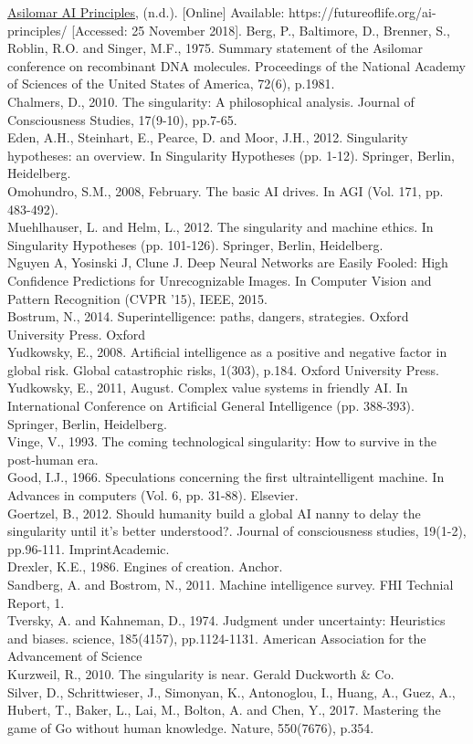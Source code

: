 \documentclass[11pt]{article}
\begin{document}
\noindent
\underline{Asilomar AI Principles}, (n.d.). [Online] Available: https://futureoflife.org/ai-principles/ [Accessed: 25 November 2018]. 
Berg, P., Baltimore, D., Brenner, S., Roblin, R.O. and Singer, M.F., 1975. Summary statement of the Asilomar conference on recombinant DNA molecules. Proceedings of the National Academy of Sciences of the United States of America, 72(6), p.1981.\\
Chalmers, D., 2010. The singularity: A philosophical analysis. Journal of Consciousness Studies, 17(9-10), pp.7-65.\\
Eden, A.H., Steinhart, E., Pearce, D. and Moor, J.H., 2012. Singularity hypotheses: an overview. In Singularity Hypotheses (pp. 1-12). Springer, Berlin, Heidelberg.\\
Omohundro, S.M., 2008, February. The basic AI drives. In AGI (Vol. 171, pp. 483-492).\\
Muehlhauser, L. and Helm, L., 2012. The singularity and machine ethics. In Singularity Hypotheses (pp. 101-126). Springer, Berlin, Heidelberg.\\
Nguyen A, Yosinski J, Clune J. Deep Neural Networks are Easily Fooled: High Confidence Predictions for Unrecognizable Images. In Computer Vision and Pattern Recognition (CVPR ’15), IEEE, 2015.\\
Bostrum, N., 2014. Superintelligence: paths, dangers, strategies. Oxford University Press. Oxford\\
Yudkowsky, E., 2008. Artificial intelligence as a positive and negative factor in global risk. Global catastrophic risks, 1(303), p.184. Oxford University Press.\\
Yudkowsky, E., 2011, August. Complex value systems in friendly AI. In International Conference on Artificial General Intelligence (pp. 388-393). Springer, Berlin, Heidelberg. \\
Vinge, V., 1993. The coming technological singularity: How to survive in the post-human era.\\
Good, I.J., 1966. Speculations concerning the first ultraintelligent machine. In Advances in computers (Vol. 6, pp. 31-88). Elsevier.\\
Goertzel, B., 2012. Should humanity build a global AI nanny to delay the singularity until it’s better understood?. Journal of consciousness studies, 19(1-2), pp.96-111. ImprintAcademic.\\
Drexler, K.E., 1986. Engines of creation. Anchor.\\
Sandberg, A. and Bostrom, N., 2011. Machine intelligence survey. FHI Technial Report, 1.\\
Tversky, A. and Kahneman, D., 1974. Judgment under uncertainty: Heuristics and biases. science, 185(4157), pp.1124-1131. American Association for the Advancement of Science\\
Kurzweil, R., 2010. The singularity is near. Gerald Duckworth \& Co.\\
Silver, D., Schrittwieser, J., Simonyan, K., Antonoglou, I., Huang, A., Guez, A., Hubert, T., Baker, L., Lai, M., Bolton, A. and Chen, Y., 2017. Mastering the game of Go without human knowledge. Nature, 550(7676), p.354. \\
\end{document}
